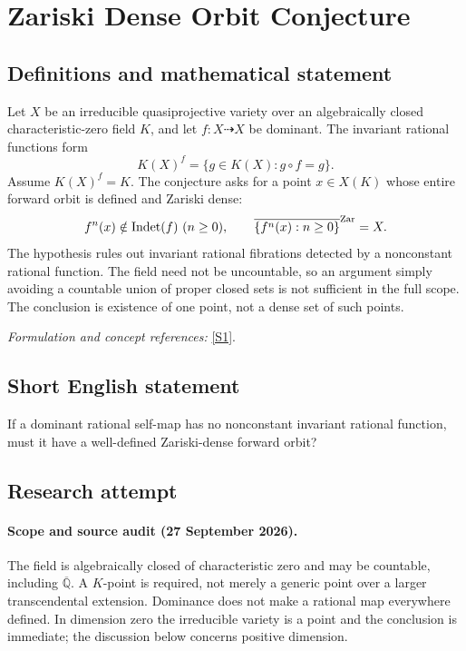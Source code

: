 \documentclass[11pt]{article}
\begin{document}
\section*{\texorpdfstring{Zariski Dense Orbit Conjecture}{Zariski Dense Orbit Conjecture}}\label{statement}
\subsection{Definitions and mathematical statement}
Let $X$ be an irreducible quasiprojective variety over an algebraically closed characteristic-zero field $K$, and let $f:X\dashrightarrow X$ be dominant. The invariant rational functions form
\[
 K(X)^f=\{g\in K(X):g\circ f=g\}.
\]
Assume $K(X)^f=K$. The conjecture asks for a point $x\in X(K)$ whose entire forward orbit is defined and Zariski dense:
\[
 f^n(x)\notin\operatorname{Indet}(f)\ (n\ge0),
 \qquad\overline{\{f^n(x):n\ge0\}}^{\rm Zar}=X.
\]
The hypothesis rules out invariant rational fibrations detected by a nonconstant rational function. The field need not be uncountable, so an argument simply avoiding a countable union of proper closed sets is not sufficient in the full scope. The conclusion is existence of one point, not a dense set of such points.
\par\smallskip\textit{Formulation and concept references:} \href{https://personal.math.ubc.ca/~dghioca/papers/conjecture_automorphisms.pdf}{[S1]}.

\subsection{Short English statement}
If a dominant rational self-map has no nonconstant invariant rational function, must it have a well-defined Zariski-dense forward orbit?
\subsection{Research attempt}

\paragraph{Scope and source audit (27 September 2026).}
The field is algebraically closed of characteristic zero and may be
countable, including $\overline{\mathbb Q}$. A $K$-point is required, not
merely a generic point over a larger transcendental extension. Dominance
does not make a rational map everywhere defined. In dimension zero the
irreducible variety is a point and the conclusion is immediate; the
discussion below concerns positive dimension.
\end{document}
